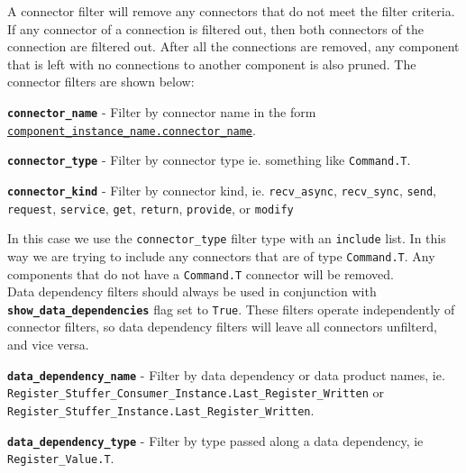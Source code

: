 A connector filter will remove any connectors that do not meet the filter criteria. If any connector of a connection is filtered out, then both connectors of the connection are filtered out. After all the connections are removed, any component that is left with no connections to another component is also pruned. The connector filters are shown below:

\vspace{5mm} %
\begin{spaceditemize}
  \item \textbf{\texttt{connector\_name}} - Filter by connector name in the form \texttt{\url{component\_instance\_name.connector\_name}}.
  \item \textbf{\texttt{connector\_type}} - Filter by connector type ie. something like \texttt{Command.T}.
  \item \textbf{\texttt{connector\_kind}} - Filter by connector kind, ie. \texttt{recv\_async}, \texttt{recv\_sync}, \texttt{send}, \texttt{request}, \texttt{service}, \texttt{get}, \texttt{return}, \texttt{provide}, or \texttt{modify}
\end{spaceditemize}
\vspace{5mm} %

In this case we use the \texttt{connector\_type} filter type with an \texttt{include} list. In this way we are trying to include any connectors that are of type \texttt{Command.T}. Any components that do not have a \texttt{Command.T} connector will be removed. \\

Data dependency filters should always be used in conjunction with \textbf{\texttt{show\_data\_dependencies}} flag set to \texttt{True}. These filters operate independently of connector filters, so data dependency filters will leave all connectors unfilterd, and vice versa.

\vspace{5mm} %
\begin{spaceditemize}
  \item \textbf{\texttt{data\_dependency\_name}} - Filter by data dependency or data product names, ie. \texttt{Register\_Stuffer\_Consumer\_Instance.Last\_Register\_Written} or \texttt{Register\_Stuffer\_Instance.Last\_Register\_Written}.
  \item \textbf{\texttt{data\_dependency\_type}} - Filter by type passed along a data dependency, ie \texttt{Register\_Value.T}.
\end{spaceditemize}
\vspace{5mm} %

